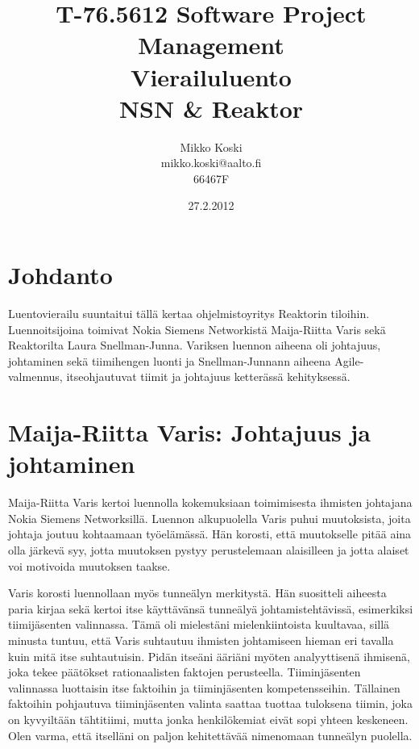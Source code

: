 \documentclass[a4paper]{article}
\begin{document}
\title{\small T-76.5612 Software Project Management \\ Vierailuluento \\ \huge NSN \& Reaktor}
\date{27.2.2012}
\author{Mikko Koski \\ mikko.koski@aalto.fi \\ 66467F}
\maketitle

\normalsize

\section{Johdanto}

Luentovierailu suuntaitui tällä kertaa ohjelmistoyritys Reaktorin tiloihin. Luennoitsijoina toimivat Nokia Siemens Networkistä Maija-Riitta Varis sekä Reaktorilta Laura Snellman-Junna. Variksen luennon aiheena oli johtajuus, johtaminen sekä tiimihengen luonti ja Snellman-Junnann aiheena Agile-valmennus, itseohjautuvat tiimit ja johtajuus ketterässä kehityksessä.

\section{Maija-Riitta Varis: Johtajuus ja johtaminen}

Maija-Riitta Varis kertoi luennolla kokemuksiaan toimimisesta ihmisten johtajana Nokia Siemens Networksillä. Luennon alkupuolella Varis puhui muutoksista, joita johtaja joutuu kohtaamaan työelämässä. Hän korosti, että muutokselle pitää aina olla järkevä syy, jotta muutoksen pystyy perustelemaan alaisilleen ja jotta alaiset voi motivoida muutoksen taakse.

Varis korosti luennollaan myös tunneälyn merkitystä. Hän suositteli aiheesta paria kirjaa sekä kertoi itse käyttävänsä tunneälyä johtamistehtävissä, esimerkiksi tiimijäsenten valinnassa. Tämä oli mielestäni mielenkiintoista kuultavaa, sillä minusta tuntuu, että Varis suhtautuu ihmisten johtamiseen hieman eri tavalla kuin mitä itse suhtautuisin. Pidän itseäni ääriäni myöten analyyttisenä ihmisenä, joka tekee päätökset rationaalisten faktojen perusteella. Tiiminjäsenten valinnassa luottaisin itse faktoihin ja tiiminjäsenten kompetensseihin. Tällainen faktoihin pohjautuva tiiminjäsenten valinta saattaa tuottaa tuloksena tiimin, joka on kyvyiltään tähtitiimi, mutta jonka henkilökemiat eivät sopi yhteen keskeneen. Olen varma, että itselläni on paljon kehitettävää nimenomaan tunneälyn puolella.
\end{document}
